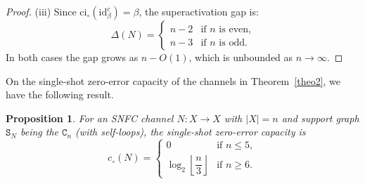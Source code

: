 \documentclass[12pt,a4paper]{article}
\newtheorem{proposition}{Proposition}
\begin{document}
\begin{proof}
\noindent(iii) Since $\mathrm{ci}_\circ(\mathrm{id}^c_\beta) = \beta$, 
the superactivation gap is:
\begin{equation*}
\Delta(N)= \begin{cases} n - 2 & \text{if } n \text{ is even,} \\ n - 3 & \text{if } n \text{ is odd.} \end{cases}
\end{equation*}
In both cases the gap grows as $n - O(1)$, which is unbounded as $n \to \infty$. 
\end{proof}

\noindent On the single-shot zero-error capacity of the channels in Theorem~\ref{theo2}, we have the following result. 

\begin{proposition}\label{prop2}
For an SNFC channel $N : X \to X$ with $|X| = n$ and support graph $\mathtt{S}_N$ being the $\mathtt{C}_n$ (with self-loops), the single-shot 
zero-error capacity is
\begin{equation*}
    c_\circ(N) = 
    \begin{cases}
        0 & \text{if } n \leq 5, \\[4pt]
        \log_2 \left\lfloor \dfrac{n}{3} \right\rfloor 
        & \text{if } n \geq 6.
    \end{cases}
\end{equation*}
\end{proposition}
\end{document}

